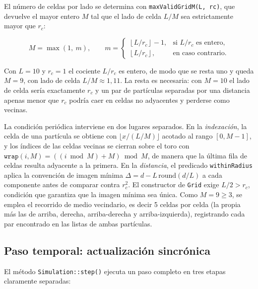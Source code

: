 \documentclass[11pt]{article}
\begin{document}
El número de celdas por lado se determina con \texttt{maxValidGridM(L, rc)},
que devuelve el mayor entero $M$ tal que el lado de celda $L/M$ sea
estrictamente mayor que $r_c$:

\begin{equation}
  M = \max\left(1,\ m\right),
  \qquad
  m = \begin{cases}
    \left\lfloor L/r_c \right\rfloor - 1, & \text{si } L/r_c \text{ es entero,} \\[2pt]
    \left\lfloor L/r_c \right\rfloor,     & \text{en caso contrario.}
  \end{cases}
  \label{eq:M}
\end{equation}

Con $L=10$ y $r_c=1$ el cociente $L/r_c$ es entero, de modo que se resta uno y
queda $M = 9$, con lado de celda $L/M \approx 1{,}11$. La resta es necesaria:
con $M=10$ el lado de celda sería exactamente $r_c$ y un par de partículas
separadas por una distancia apenas menor que $r_c$ podría caer en celdas no
adyacentes y perderse como vecinas.

La condición periódica interviene en dos lugares separados. En la
\emph{indexación}, la celda de una partícula se obtiene con
$\lfloor x/(L/M) \rfloor$ acotado al rango $[0, M-1]$, y los índices de las
celdas vecinas se cierran sobre el toro con
$\texttt{wrap}(i, M) = ((i \bmod M) + M) \bmod M$, de manera que la última fila
de celdas resulta adyacente a la primera. En la \emph{distancia}, el predicado
\texttt{withinRadius} aplica la convención de imagen mínima
$\Delta = d - L\,\mathrm{round}(d/L)$ a cada componente antes de comparar contra
$r_c^2$. El constructor de \texttt{Grid} exige $L/2 > r_c$, condición que
garantiza que la imagen mínima sea única. Como $M = 9 \geq 3$, se emplea el
recorrido de medio vecindario, es decir 5 celdas por celda (la propia más las
de arriba, derecha, arriba-derecha y arriba-izquierda), registrando cada par
encontrado en las listas de ambas partículas.

\subsection{Paso temporal: actualización sincrónica}
\label{sec:step}

El método \texttt{Simulation::step()} ejecuta un paso completo en tres etapas
claramente separadas:
\end{document}
